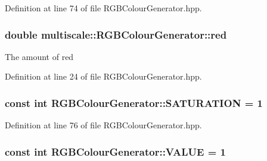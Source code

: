 \-Definition at line 74 of file \-R\-G\-B\-Colour\-Generator.\-hpp.

\hypertarget{classmultiscale_1_1RGBColourGenerator_a11da8c4a9ca59ea8c20177cbb5b57ceb}{
\subsubsection[{red}]{\setlength{\rightskip}{0pt plus 5cm}double {\bf multiscale\-::\-R\-G\-B\-Colour\-Generator\-::red}}}\label{classmultiscale_1_1RGBColourGenerator_a11da8c4a9ca59ea8c20177cbb5b57ceb}
\-The amount of red 

\-Definition at line 24 of file \-R\-G\-B\-Colour\-Generator.\-hpp.

\hypertarget{classmultiscale_1_1RGBColourGenerator_a9442495dac9306e4172a27cba12788cc}{
\subsubsection[{\-S\-A\-T\-U\-R\-A\-T\-I\-O\-N}]{\setlength{\rightskip}{0pt plus 5cm}const int {\bf \-R\-G\-B\-Colour\-Generator\-::\-S\-A\-T\-U\-R\-A\-T\-I\-O\-N} = 1}}\label{classmultiscale_1_1RGBColourGenerator_a9442495dac9306e4172a27cba12788cc}


\-Definition at line 76 of file \-R\-G\-B\-Colour\-Generator.\-hpp.

\hypertarget{classmultiscale_1_1RGBColourGenerator_a859abef56e015354d032c46680132850}{
\subsubsection[{\-V\-A\-L\-U\-E}]{\setlength{\rightskip}{0pt plus 5cm}const int {\bf \-R\-G\-B\-Colour\-Generator\-::\-V\-A\-L\-U\-E} = 1}}\label{classmultiscale_1_1RGBColourGenerator_a859abef56e015354d032c46680132850}


